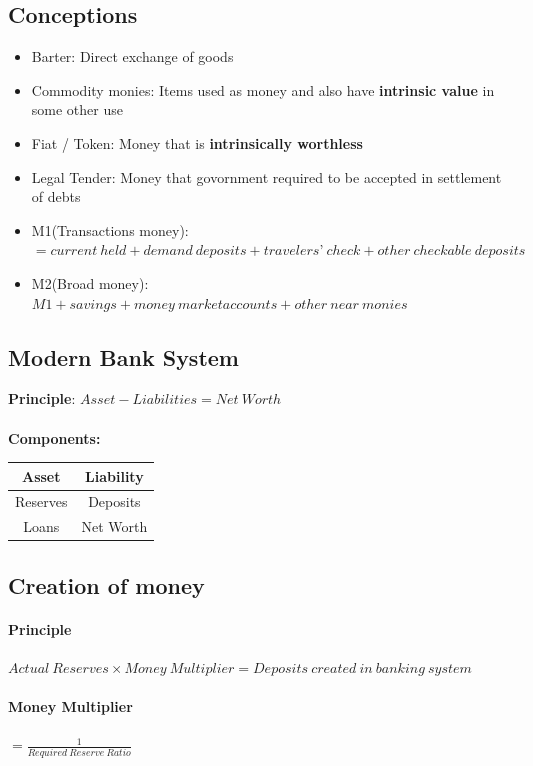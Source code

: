 \documentclass[11pt]{article}
\begin{document}
\subsection{Conceptions}
    \begin{itemize}
        \item Barter: Direct exchange of goods
        \item Commodity monies: Items used as money and also have \textbf{intrinsic value} in some other use
        \item Fiat / Token: Money that is \textbf{intrinsically worthless}
        \item Legal Tender: Money that govornment required to be accepted in settlement of debts
        \item M1(Transactions money): $=current\ held + demand\ deposits + travelers’\ check + other\ checkable\ deposits$
        \item M2(Broad money): $M1 + savings + money\ market accounts + other\ near\ monies$
    \end{itemize}

\subsection{Modern Bank System}
\textbf{Principle}: $Asset - Liabilities = Net\ Worth$\\\\
\textbf{Components:}\\

    \begin{tabular}{| c | c |}
        \hline
            Asset & Liability\\
        \hline
            Reserves & Deposits\\
            Loans & Net Worth\\
        \hline
    \end{tabular}

\subsection{Creation of money}
\paragraph{Principle}
$Actual\ Reserves \times Money\ Multiplier = Deposits\ created\ in\ banking\ system$
\paragraph{Money Multiplier}
$= \frac{1}{Required\ Reserve\ Ratio}$
\end{document}

